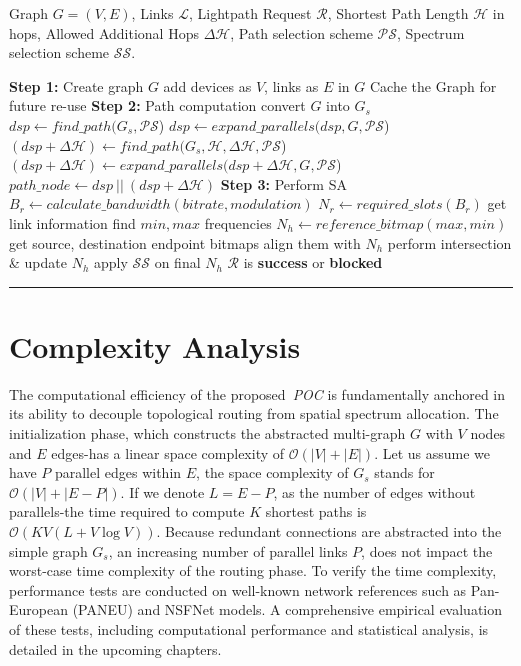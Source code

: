 \documentclass[12pt, a4paper, twoside, openright]{report}
\begin{document}
\begin{algorithmic}[1] %
    \REQUIRE Graph $G=(V, E)$, Links $\mathcal{L}$, Lightpath Request $\mathcal{R}$, Shortest Path Length $\mathcal{H}$ in hops, Allowed Additional Hops $\Delta\mathcal{H}$, Path selection scheme $\mathcal{PS}$, Spectrum selection scheme $\mathcal{SS}$.

    \STATE \textbf{Step 1:} Create graph $G$
    \STATE add devices as $V$, links as $E$ in $G$
    \ENDFOR
    \STATE Cache the Graph for future re-use
    \STATE \textbf{Step 2:} Path computation
    \STATE convert $G$ into $G_{s}$
    \STATE $dsp\leftarrow find\_path(G_{s}, \mathcal{PS}$)
        \STATE $dsp\leftarrow expand\_parallels(dsp, G, \mathcal{PS}$)
    \STATE $(dsp+\Delta\mathcal{H}) \leftarrow find\_path(G_{s}, \mathcal{H}, \Delta\mathcal{H}, \mathcal{PS}$)
        \STATE $(dsp+\Delta\mathcal{H})\leftarrow expand\_parallels(dsp+\Delta\mathcal{H}, G, \mathcal{PS}$)
    \STATE $path\_node \leftarrow dsp\ ||\ (dsp+\Delta\mathcal{H})$
    \STATE \textbf{Step 3:} Perform SA
    \STATE $B_r \leftarrow calculate\_bandwidth(bitrate, modulation)$
    \STATE $N_r \leftarrow required\_slots(B_r)$
    \STATE get link information
    \STATE find $min, max$ frequencies
    \ENDFOR
    \STATE $N_h\leftarrow reference\_bitmap(max, min)$
    \STATE get source, destination endpoint bitmaps
    \STATE align them with $N_h$
    \STATE perform intersection \& update $N_h$
    \ENDFOR
    \STATE apply $\mathcal{SS}$ on final $N_h$
    \STATE $\mathcal{R}$ is \textbf{success} or \textbf{blocked}
\end{algorithmic}
\vspace{0.2cm}
\hrule
\section{Complexity Analysis} \label{complexity_analysis}
The computational efficiency of the proposed~\emph{POC} is fundamentally anchored in its ability to decouple topological routing from spatial spectrum allocation. The initialization phase, which constructs the abstracted multi-graph $G$ with $V$ nodes and $E$ edges-has a linear space complexity of $\mathcal{O}(|V|+|E|)$. Let us assume we have $P$ parallel edges within $E$, the space complexity of $G_s$ stands for $\mathcal{O}(|V|+|E-P|)$. If we denote $L=E-P$, as the number of edges without parallels-the time required to compute $K$ shortest paths is $\mathcal{O}(KV(L+V\log V))$. Because redundant connections are abstracted into the simple graph $G_s$, an increasing number of parallel links $P$, does not impact the worst-case time complexity of the routing phase. To verify the time complexity, performance tests are conducted on well-known network references such as Pan-European (PANEU) and NSFNet models. A comprehensive empirical evaluation of these tests, including computational performance and statistical analysis, is detailed in the upcoming chapters.
\end{document}
